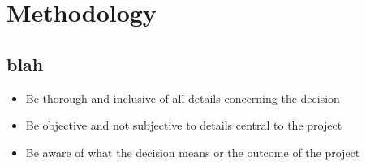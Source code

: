 \documentclass[a4paper, 10pt, conference]{IEEEconf}
\begin{document}
\begin{comment}
?	There are many ways to organise the evaluation of the sources. Chronological and thematic approaches are each useful examples.
?	Each work should be critically summarised and evaluated for its premise, methodology, and conclusion. It is as important to address inconsistencies, omissions, and errors, as it is to identify accuracy, depth, and relevance.
?	Use logical connections and transitions to connect sources.

Relevant and logical flow of information
o Identify and discuss key areas of the research topic o Use of recent and relevant peer-reviewed journal
articles, books and other relevant material (e.g. reports
from previous work)
o Discuss techniques and equipment that are appropriate
for the research topic
o Identify gaps in the research
\end{comment}

\clearpage
\section{Methodology}

\subsection{blah}

\begin{comment}
this part here does this and this and this, this other part does this and this but we want to achieve this and this so we have chosen this sensor.

these sensors won?t work because of this and these sensors are ok for this but here are the faults

find where the research leads to and present it in that way for the end product and explaining things.

This is what the guy was explaining and not pulling things out of the sky.

Critical analysis
o Evaluate relevant research done by other researchers by ? Determining strengths and weaknesses of methods,
results, conclusions and recommendations ? Expressing and justifying agreement and
disagreement
\end{comment}




\begin{itemize}
	\item Be thorough and inclusive of all details concerning the decision 
	\item Be objective and not subjective to details central to the project
	\item Be aware of what the decision means or the outcome of the project
\end{itemize}	
\end{document}
